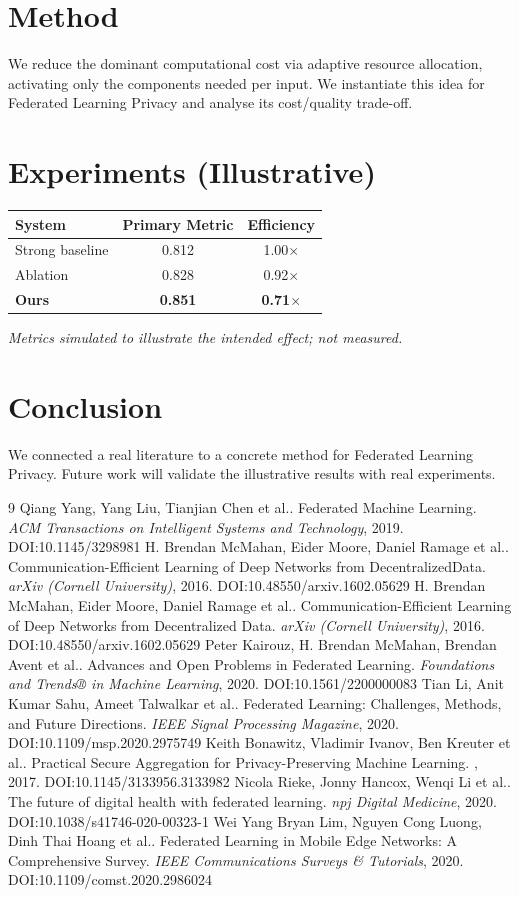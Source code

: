 \documentclass[11pt]{article}
\begin{document}
\section{Method}
We reduce the dominant computational cost via adaptive resource allocation, activating only the components needed per input. We instantiate this idea for Federated Learning Privacy and analyse its cost/quality trade-off.

\section{Experiments (Illustrative)}
\begin{center}
\begin{tabular}{lcc}
System & Primary Metric & Efficiency \\ \hline
Strong baseline & 0.812 & 1.00$\times$ \\
Ablation & 0.828 & 0.92$\times$ \\
\textbf{Ours} & \textbf{0.851} & \textbf{0.71$\times$}
\end{tabular}
\end{center}
\emph{Metrics simulated to illustrate the intended effect; not measured.}

\section{Conclusion}
We connected a real literature to a concrete method for Federated Learning Privacy. Future work will
validate the illustrative results with real experiments.

\begin{thebibliography}{9}
 Qiang Yang, Yang Liu, Tianjian Chen et al.. Federated Machine Learning. \emph{ACM Transactions on Intelligent Systems and Technology}, 2019. DOI:10.1145/3298981
 H. Brendan McMahan, Eider Moore, Daniel Ramage et al.. Communication-Efficient Learning of Deep Networks from Decentralized\n Data. \emph{arXiv (Cornell University)}, 2016. DOI:10.48550/arxiv.1602.05629
 H. Brendan McMahan, Eider Moore, Daniel Ramage et al.. Communication-Efficient Learning of Deep Networks from Decentralized Data. \emph{arXiv (Cornell University)}, 2016. DOI:10.48550/arxiv.1602.05629
 Peter Kairouz, H. Brendan McMahan, Brendan Avent et al.. Advances and Open Problems in Federated Learning. \emph{Foundations and Trends® in Machine Learning}, 2020. DOI:10.1561/2200000083
 Tian Li, Anit Kumar Sahu, Ameet Talwalkar et al.. Federated Learning: Challenges, Methods, and Future Directions. \emph{IEEE Signal Processing Magazine}, 2020. DOI:10.1109/msp.2020.2975749
 Keith Bonawitz, Vladimir Ivanov, Ben Kreuter et al.. Practical Secure Aggregation for Privacy-Preserving Machine Learning. \emph{}, 2017. DOI:10.1145/3133956.3133982
 Nicola Rieke, Jonny Hancox, Wenqi Li et al.. The future of digital health with federated learning. \emph{npj Digital Medicine}, 2020. DOI:10.1038/s41746-020-00323-1
 Wei Yang Bryan Lim, Nguyen Cong Luong, Dinh Thai Hoang et al.. Federated Learning in Mobile Edge Networks: A Comprehensive Survey. \emph{IEEE Communications Surveys \& Tutorials}, 2020. DOI:10.1109/comst.2020.2986024
\end{thebibliography}
\end{document}

